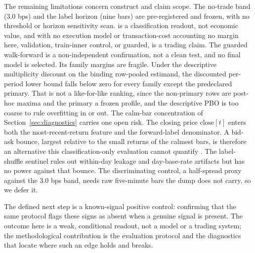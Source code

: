 The remaining limitations concern construct and claim scope. The no-trade band
($3.0$ bps) and the label horizon (nine bars) are pre-registered and frozen, with
no threshold or horizon sensitivity scan. \macrofone{} is a classification
readout, not economic value, and with no execution model or transaction-cost
accounting no margin here, validation, train-inner control, or guarded, is a
trading claim. The guarded walk-forward is a non-independent confirmation, not a
clean test, and no final model is selected. Its family margins are fragile. Under
the descriptive multiplicity discount on the binding row-pooled estimand, the
discounted per-period lower bound falls below zero for every family except the
predeclared primary. That is not a like-for-like ranking, since the non-primary
rows are post-hoc maxima and the primary a frozen profile, and the descriptive
PBO is too coarse to rule overfitting in or out. The calm-bar
concentration of Section~\ref{sec:diagnostics} carries one open risk. The closing
price $\text{close}[t]$ enters both the most-recent-return feature and the
forward-label denominator. A bid-ask bounce, largest relative to the small
returns of the calmest bars, is therefore an alternative this classification-only
evaluation cannot quantify \cite{roll1984simple,lo1990nonsynchronous}. The
label-shuffle sentinel rules out within-day leakage and day-base-rate artifacts
but has no power against that bounce. The discriminating control, a half-spread
proxy against the $3.0$ bps band, needs raw five-minute bars the dump does not
carry, so we defer it.

The defined next step is a known-signal positive control: confirming that the
same protocol flags these signs as absent when a genuine signal is
present. The outcome here is a weak, conditional readout, not a model or a trading
system; the methodological contribution is the evaluation protocol and the diagnostics
that locate where such an edge holds and breaks.
